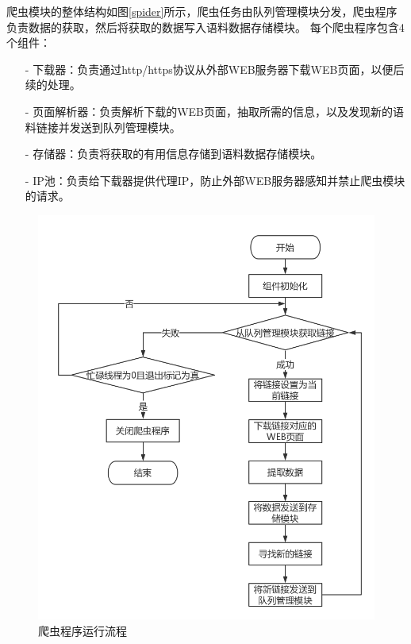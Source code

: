 爬虫模块的整体结构如图\ref{spider}所示，爬虫任务由队列管理模块分发，爬虫程序
负责数据的获取，然后将获取的数据写入语料数据存储模块。
每个爬虫程序包含4个组件：
\begin{itemize}
    \item[-] 下载器：负责通过http/https协议从外部WEB服务器下载WEB页面，以便后续的处理。
    \item[-] 页面解析器：负责解析下载的WEB页面，抽取所需的信息，以及发现新的语料链接并发送到队列管理模块。
    \item[-] 存储器：负责将获取的有用信息存储到语料数据存储模块。
    \item[-] IP池：负责给下载器提供代理IP，防止外部WEB服务器感知并禁止爬虫模块的请求。
\end{itemize}
\begin{figure}[!hbp]
    \includegraphics[scale=0.4]{picture/spider_flowchart.png}
    \caption{爬虫程序运行流程}
    \label{spider_flowchart}
\end{figure}

